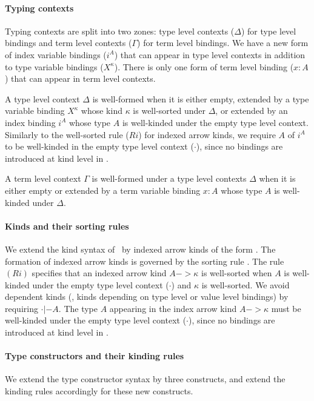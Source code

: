 \paragraph{Typing contexts}
Typing contexts are split into two zones:
type level contexts ($\Delta$) for type level bindings
and term level contexts ($\Gamma$) for term level bindings.
We have a new form of index variable bindings ($i^A$) that can appear in
type level contexts in addition to type variable bindings ($X^\kappa$).
There is only one form of term level binding ($x:A$) that can appear in
term level contexts.

A type level context $\Delta$ is well-formed when it is either empty,
extended by a type variable binding $X^\kappa$ whose kind $\kappa$ is
well-sorted under $\Delta$, or extended by an index binding $i^A$
whose type $A$ is well-kinded under the empty type level context.
Similarly to the well-sorted rule ($Ri$) for indexed arrow kinds,
we require $A$ of $i^A$ to be well-kinded in the empty type level context
($\cdot$), since no bindings are introduced at kind level in \Fi.

A term level context $\Gamma$ is well-formed under a type level contexts
$\Delta$ when it is either empty or extended by a term variable binding
$x:A$ whose type $A$ is well-kinded under $\Delta$.


\paragraph{Kinds and their sorting rules}
We extend the kind syntax of \Fw\ by indexed arrow kinds of the form
. The formation of indexed arrow kinds is
governed by the sorting rule . The rule $(Ri)$ specifies that
an indexed arrow kind $A -> \kappa$ is well-sorted when $A$ is well-kinded
under the empty type level context ($\cdot$) and $\kappa$ is well-sorted.
We avoid dependent kinds (\ie, kinds depending on type level or value level
bindings) by requiring $\cdot |- A$. The type $A$ appearing in
the index arrow kind $A -> \kappa$ must be well-kinded under
the empty type level context ($\cdot$), since no bindings are
introduced at kind level in \Fi.

\paragraph{Type constructors and their kinding rules}
We extend the type constructor syntax by three constructs,
and extend the kinding rules accordingly for these new constructs.

